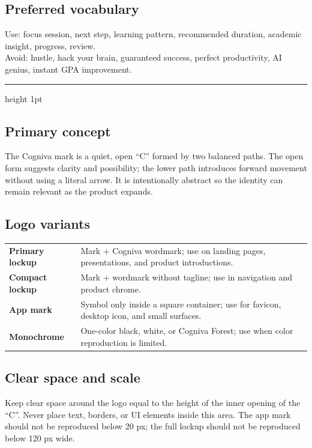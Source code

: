 \documentclass[11pt,a4paper]{article}
\newcommand{\sectiontitle}[1]{\vspace{4pt}{\color{CognivaForest}\LARGE\bfseries #1}\par\vspace{5pt}\hrule height 1pt\vspace{10pt}}
\begin{document}
\subsection*{Preferred vocabulary}
Use: focus session, next step, learning pattern, recommended duration, academic insight, progress, review.\\
Avoid: hustle, hack your brain, guaranteed success, perfect productivity, AI genius, instant GPA improvement.

\newpage\sectiontitle{03 — Logo system}
\subsection*{Primary concept}
The Cogniva mark is a quiet, open “C” formed by two balanced paths. The open form suggests clarity and possibility; the lower path introduces forward movement without using a literal arrow. It is intentionally abstract so the identity can remain relevant as the product expands.

\begin{center}\end{center}

\subsection*{Logo variants}
\begin{tabularx}{\textwidth}{>{\bfseries}p{3.4cm}X}
Primary lockup & Mark + Cogniva wordmark; use on landing pages, presentations, and product introductions.\\
Compact lockup & Mark + wordmark without tagline; use in navigation and product chrome.\\
App mark & Symbol only inside a square container; use for favicon, desktop icon, and small surfaces.\\
Monochrome & One-color black, white, or Cogniva Forest; use when color reproduction is limited.\\
\end{tabularx}

\subsection*{Clear space and scale}
Keep clear space around the logo equal to the height of the inner opening of the “C”. Never place text, borders, or UI elements inside this area. The app mark should not be reproduced below 20 px; the full lockup should not be reproduced below 120 px wide.
\end{document}
